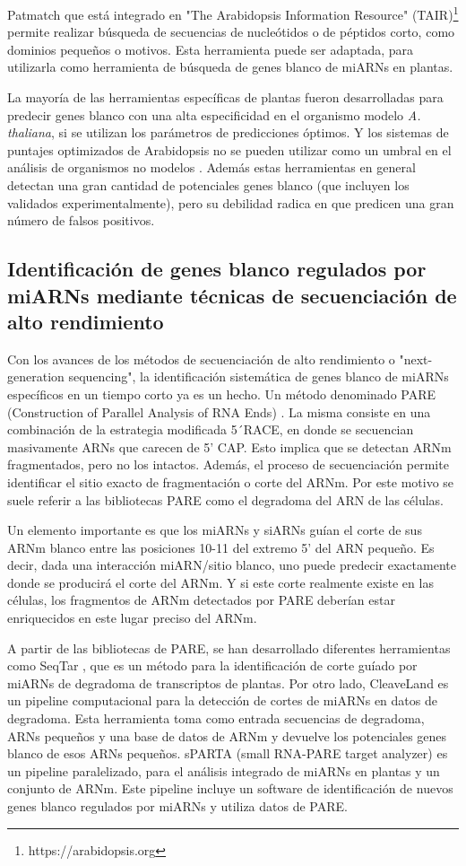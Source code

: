 Patmatch \citep{Yan01072005} que está integrado en "The Arabidopsis Information Resource" (TAIR)\footnote{https://arabidopsis.org} permite realizar búsqueda de secuencias de nucleótidos o de péptidos corto, como dominios pequeños o motivos.
Esta herramienta puede ser adaptada, para utilizarla como herramienta de búsqueda de genes blanco de miARNs en plantas.

La mayoría de las herramientas específicas de plantas fueron desarrolladas para predecir genes blanco con una alta especificidad en el organismo modelo \textit{A. thaliana}, si se utilizan los parámetros de predicciones óptimos.
Y los sistemas de puntajes optimizados de Arabidopsis no se pueden utilizar como un umbral en el análisis de organismos no modelos \citep{pmid24885295}.
Además estas herramientas en general detectan una gran cantidad de potenciales genes blanco (que incluyen los validados experimentalmente), pero su debilidad radica en que predicen una gran número de falsos positivos.

\subsection{Identificación de genes blanco regulados por miARNs mediante técnicas de secuenciación de alto rendimiento}
Con los avances de los métodos de secuenciación de alto rendimiento o "next-generation sequencing", la identificación sistemática de genes blanco de miARNs específicos en un tiempo corto ya es un hecho.
Un método denominado PARE (Construction of Parallel Analysis of RNA Ends) \citep{pmid19247285}.
La misma consiste en una combinación de la estrategia modificada 5´RACE, en donde se secuencian masivamente ARNs que carecen de 5’ CAP.
Esto implica que se detectan ARNm fragmentados, pero no los intactos.
Además, el proceso de secuenciación permite identificar el sitio exacto de fragmentación o corte del ARNm.
Por este motivo se suele referir a las bibliotecas PARE como el degradoma del ARN de las células. 

Un elemento importante es que los miARNs y siARNs guían el corte de sus ARNm blanco entre las posiciones 10-11 del extremo 5' del ARN pequeño.
Es decir, dada una interacción miARN/sitio blanco, uno puede predecir exactamente donde se producirá el corte del ARNm.
Y si este corte realmente existe en las células, los fragmentos de ARNm detectados por PARE deberían estar enriquecidos en este lugar preciso del ARNm.

A partir de las bibliotecas de PARE, se han desarrollado diferentes herramientas como SeqTar \citep{pmid22140118}, que es un método para la identificación de corte guíado por miARNs de degradoma de transcriptos de plantas.
Por otro lado, CleaveLand \citep{pmid19017659} es un pipeline computacional para la detección de cortes de miARNs en datos de degradoma.
Esta herramienta toma como entrada secuencias de degradoma, ARNs pequeños y una base de datos de ARNm y devuelve los potenciales genes blanco de esos ARNs pequeños. 
sPARTA (small RNA-PARE target analyzer) \citep{pmid25120269} es un pipeline paralelizado, para el análisis integrado de miARNs en plantas y un conjunto de ARNm.
Este pipeline incluye un software de identificación de nuevos genes blanco regulados por miARNs y utiliza datos de PARE.


